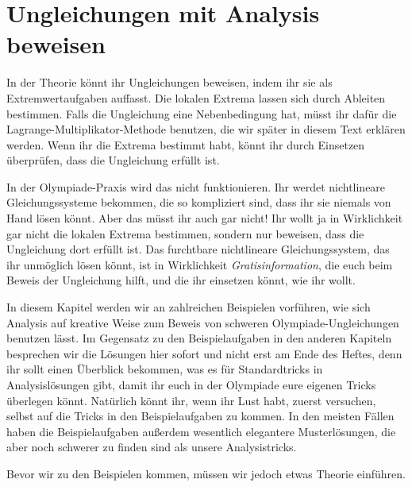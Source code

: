\section{Ungleichungen mit Analysis beweisen}\label{kapitel:Analysis}
In der Theorie könnt ihr Ungleichungen beweisen, indem ihr sie als Extremwertaufgaben auffasst. Die lokalen Extrema lassen sich durch Ableiten bestimmen. Falls die Ungleichung eine Nebenbedingung hat, müsst ihr dafür die Lagrange-Multiplikator-Methode benutzen, die wir später in diesem Text erklären werden. Wenn ihr die Extrema bestimmt habt, könnt ihr durch Einsetzen überprüfen, dass die Ungleichung erfüllt ist.

In der Olympiade-Praxis wird das nicht funktionieren. Ihr werdet nichtlineare Gleichungssysteme bekommen, die so kompliziert sind, dass ihr sie niemals von Hand lösen könnt. Aber das müsst ihr auch gar nicht! Ihr wollt ja in Wirklichkeit gar nicht die lokalen Extrema bestimmen, sondern nur beweisen, dass die Ungleichung dort erfüllt ist. Das furchtbare nichtlineare Gleichungssystem, das ihr unmöglich lösen könnt, ist in Wirklichkeit \emph{Gratisinformation}, die euch beim Beweis der Ungleichung hilft, und die ihr einsetzen könnt, wie ihr wollt.

In diesem Kapitel werden wir an zahlreichen Beispielen vorführen, wie sich Analysis auf kreative Weise zum Beweis von schweren Olympiade-Ungleichungen benutzen lässt. Im Gegensatz zu den Beispielaufgaben in den anderen Kapiteln besprechen wir die Lösungen hier sofort und nicht erst am Ende des Heftes, denn ihr sollt einen Überblick bekommen, was es für Standardtricks in Analysislösungen gibt, damit ihr euch in der Olympiade eure eigenen Tricks überlegen könnt. Natürlich könnt ihr, wenn ihr Lust habt, zuerst versuchen, selbst auf die Tricks in den Beispielaufgaben zu kommen. In den meisten Fällen haben die Beispielaufgaben außerdem wesentlich elegantere Musterlösungen, die aber noch schwerer zu finden sind als unsere Analysistricks. 

Bevor wir zu den Beispielen kommen, müssen wir jedoch etwas Theorie einführen.%

